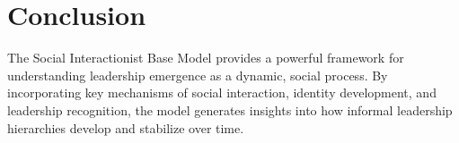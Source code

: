 \documentclass[12pt]{article}
\begin{document}
\section{Conclusion}
The Social Interactionist Base Model provides a powerful framework for understanding leadership emergence as a dynamic, social process. By incorporating key mechanisms of social interaction, identity development, and leadership recognition, the model generates insights into how informal leadership hierarchies develop and stabilize over time.
\end{document}

